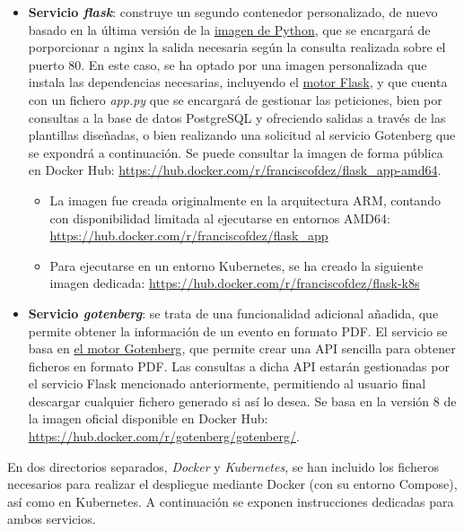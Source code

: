 \documentclass{report}
\begin{document}
\begin{itemize}
\begin{itemize}
            \end{itemize}
            \item \textbf{Servicio \textit{flask}}: construye un segundo contenedor personalizado, de nuevo basado en la última versión de la \href{https://hub.docker.com/_/python}{imagen de Python}, que se encargará de porporcionar a nginx la salida necesaria según la consulta realizada sobre el puerto 80. En este caso, se ha optado por una imagen personalizada que instala las dependencias necesarias, incluyendo el \href{https://flask.palletsprojects.com/en/stable/}{motor Flask}, y que cuenta con un fichero \textit{app.py} que se encargará de gestionar las peticiones, bien por consultas a la base de datos PostgreSQL y ofreciendo salidas a través de las plantillas diseñadas, o bien realizando una solicitud al servicio Gotenberg que se expondrá a continuación. Se puede consultar la imagen de forma pública en Docker Hub: \url{https://hub.docker.com/r/franciscofdez/flask_app-amd64}.
            \begin{itemize}
                \item La imagen fue creada originalmente en la arquitectura ARM, contando con disponibilidad limitada al ejecutarse en entornos AMD64: \url{https://hub.docker.com/r/franciscofdez/flask_app}
                \item Para ejecutarse en un entorno Kubernetes, se ha creado la siguiente imagen dedicada: \url{https://hub.docker.com/r/franciscofdez/flask-k8s}
            \end{itemize}
            \item \textbf{Servicio \textit{gotenberg}}: se trata de una funcionalidad adicional añadida, que permite obtener la información de un evento en formato PDF. El servicio se basa en \href{https://gotenberg.dev}{el motor Gotenberg}, que permite crear una API sencilla para obtener ficheros en formato PDF. Las consultas a dicha API estarán gestionadas por el servicio Flask mencionado anteriormente, permitiendo al usuario final descargar cualquier fichero generado si así lo desea. Se basa en la versión 8 de la imagen oficial disponible en Docker Hub: \url{https://hub.docker.com/r/gotenberg/gotenberg/}.
        \end{itemize}

        En dos directorios separados, \textit{Docker} y \textit{Kubernetes}, se han incluido los ficheros necesarios para realizar el despliegue mediante Docker (con su entorno Compose), así como en Kubernetes. A continuación se exponen instrucciones dedicadas para ambos servicios.
        
\end{document}
